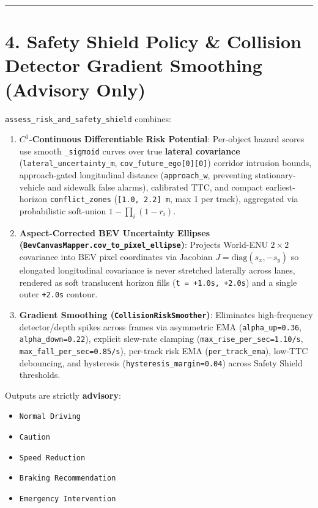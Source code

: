 \documentclass[10.5pt,a4paper]{article}
\begin{document}
\par\noindent\rule{\textwidth}{0.4pt}\par\medskip

\section{4. Safety Shield Policy \& Collision Detector Gradient Smoothing (Advisory Only)}

\texttt{assess\_\allowbreak{}risk\_\allowbreak{}and\_\allowbreak{}safety\_\allowbreak{}shield} combines:

\begin{enumerate}[leftmargin=1.8em,itemsep=2pt]
\item \textbf{$C^1$-Continuous Differentiable Risk Potential}: Per-object hazard scores use smooth \texttt{\_\allowbreak{}sigmoid} curves over true \textbf{lateral covariance} (\texttt{lateral\_\allowbreak{}uncertainty\_\allowbreak{}m}, \texttt{cov\_\allowbreak{}future\_\allowbreak{}ego[0][0]}) corridor intrusion bounds, approach-gated longitudinal distance (\texttt{approach\_\allowbreak{}w}, preventing stationary-vehicle and sidewalk false alarms), calibrated TTC, and compact earliest-horizon \texttt{conflict\_\allowbreak{}zones} (\texttt{[1.\allowbreak{}0,\allowbreak{} 2.\allowbreak{}2] m}, max 1 per track), aggregated via probabilistic soft-union $1 - \prod_i (1 - r_i)$.
\item \textbf{Aspect-Corrected BEV Uncertainty Ellipses (\texttt{BevCanvasMapper.\allowbreak{}cov\_\allowbreak{}to\_\allowbreak{}pixel\_\allowbreak{}ellipse})}: Projects World-ENU $2\times 2$ covariance into BEV pixel coordinates via Jacobian $J = \text{diag}(s_x, -s_y)$ so elongated longitudinal covariance is never stretched laterally across lanes, rendered as soft translucent horizon fills (\texttt{t = +1.\allowbreak{}0s,\allowbreak{} +2.\allowbreak{}0s}) and a single outer \texttt{+2.\allowbreak{}0s} contour.
\item \textbf{Gradient Smoothing (\texttt{CollisionRiskSmoother})}: Eliminates high-frequency detector/depth spikes across frames via asymmetric EMA (\texttt{alpha\_\allowbreak{}up=0.\allowbreak{}36}, \texttt{alpha\_\allowbreak{}down=0.\allowbreak{}22}), explicit slew-rate clamping (\texttt{max\_\allowbreak{}rise\_\allowbreak{}per\_\allowbreak{}sec=1.\allowbreak{}10/\allowbreak{}s}, \texttt{max\_\allowbreak{}fall\_\allowbreak{}per\_\allowbreak{}sec=0.\allowbreak{}85/\allowbreak{}s}), per-track risk EMA (\texttt{per\_\allowbreak{}track\_\allowbreak{}ema}), low-TTC debouncing, and hysteresis (\texttt{hysteresis\_\allowbreak{}margin=0.\allowbreak{}04}) across Safety Shield thresholds.
\end{enumerate}

Outputs are strictly \textbf{advisory}:

\begin{itemize}[leftmargin=1.5em,itemsep=2pt]
\item \texttt{Normal Driving}
\item \texttt{Caution}
\item \texttt{Speed Reduction}
\item \texttt{Braking Recommendation}
\item \texttt{Emergency Intervention}
\end{itemize}
\end{document}
